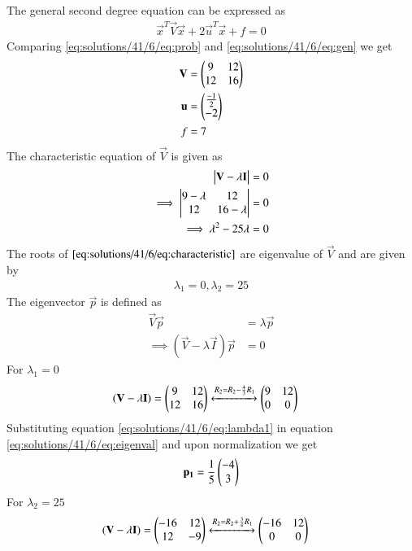 The general second degree equation can be expressed as
\begin{align}
    \vec{x}^T\vec{V}\vec{x}+2\vec{u}^T\vec{x}+f = 0\label{eq:solutions/41/6/eq:gen}
\end{align}
Comparing \eqref{eq:solutions/41/6/eq:prob} and \eqref{eq:solutions/41/6/eq:gen} we get
\begin{align}
    \mathbf{V}&=\begin{pmatrix}9 & 12 \\ 12 & 16\end{pmatrix}\label{eq:solutions/41/6/eq:V}\\
    \mathbf{u}&=\begin{pmatrix}\frac{-1}{2} \\ -2\end{pmatrix}\label{eq:solutions/41/6/eq:u}\\
    f&=7\label{eq:solutions/41/6/eq:f}
\end{align}
The characteristic equation of $\vec{V}$ is given as
\begin{align}
    \begin{vmatrix}\mathbf{V}-\lambda\mathbf{I}\end{vmatrix}&=0\\
    \implies\begin{vmatrix}9-\lambda & 12\\12&16-\lambda\end{vmatrix}&=0\\
    \implies\lambda^2-25\lambda&=0\label{eq:solutions/41/6/eq:characteristic}
\end{align}
The roots of $\eqref{eq:solutions/41/6/eq:characteristic}$ are eigenvalue of $\vec{V}$ and are given by
\begin{align*}
    \lambda_1=0,\lambda_2=25
\end{align*}
The eigenvector $\vec{p}$ is defined as
\begin{align}
    \vec{V}\vec{p}&=\lambda\vec{p}\\
    \implies(\vec{V}-\lambda\vec{I})\vec{p}&=0\label{eq:solutions/41/6/eq:eigenval}
\end{align}
For $\lambda_1=0$
\begin{align}
    &(\mathbf{V}-\lambda\mathbf{I})=\begin{pmatrix}9&12\\12&16\end{pmatrix}\xleftrightarrow{R_2=R_2-\frac{4}{3}R_1}\begin{pmatrix}9&12\\0&0\end{pmatrix}\label{eq:solutions/41/6/eq:lambda1}
\end{align}
Substituting equation \eqref{eq:solutions/41/6/eq:lambda1} in equation \eqref{eq:solutions/41/6/eq:eigenval} and upon normalization we get
\begin{align}
    \mathbf{p_1} = \frac{1}{5}\begin{pmatrix}-4\\3\end{pmatrix}\label{eq:solutions/41/6/eq:p1}
\end{align}
For $\lambda_2=25$
\begin{align}
    &(\mathbf{V}-\lambda\mathbf{I})=\begin{pmatrix}-16&12\\12&-9\end{pmatrix}\xleftrightarrow{R_2=R_2+\frac{3}{4}R_1}\begin{pmatrix}-16&12\\0&0\end{pmatrix}\label{eq:solutions/41/6/eq:lambda2}
\end{align}
